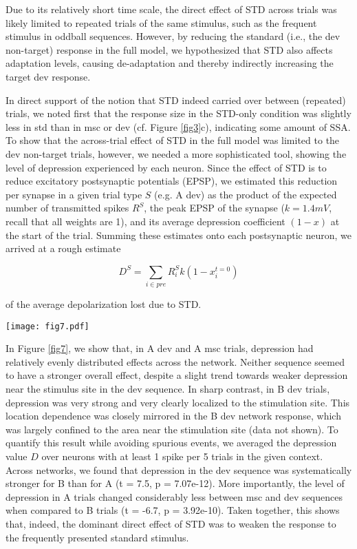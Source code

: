 \documentclass[pdflatex,referee,iicol,sn-basic]{sn-jnl}
\theoremstyle{thmstyleone}%
\theoremstyle{thmstyletwo}%
\theoremstyle{thmstylethree}%
\begin{document}
Due to its relatively short time scale, the direct effect of STD across trials was likely limited to repeated trials of the same stimulus, such as the frequent stimulus in oddball sequences. However, by reducing the standard (i.e., the dev non-target) response in the full model, we hypothesized that STD also affects adaptation levels, causing de-adaptation and thereby indirectly increasing the target dev response.

In direct support of the notion that STD indeed carried over between (repeated) trials, we noted first that the response size in the STD-only condition was slightly less in std than in msc or dev (cf. Figure \ref{fig3}c), indicating some amount of SSA. To show that the across-trial effect of STD in the full model was limited to the dev non-target trials, however, we needed a more sophisticated tool, showing the level of depression experienced by each neuron. Since the effect of STD is to reduce excitatory postsynaptic potentials (EPSP), we estimated this reduction per synapse in a given trial type $S$ (e.g. A dev) as the product of the expected number of transmitted spikes $R^S$, the peak EPSP of the synapse ($k = 1.4 mV$, recall that all weights are 1), and its average depression coefficient $(1-x)$ at the start of the trial. Summing these estimates onto each postsynaptic neuron, we arrived at a rough estimate

\begin{equation}
    D^S = \sum_{i \in pre} R^S_i k (1-x_i^{t=0})
\end{equation}

of the average depolarization lost due to STD.

\begin{figure*}%
    \centering
    \texttt{[image: fig7.pdf]}
    \caption{}
    \label{fig7}
\end{figure*}

In Figure \ref{fig7}, we show that, in A dev and A msc trials, depression had relatively evenly distributed effects across the network. Neither sequence seemed to have a stronger overall effect, despite a slight trend towards weaker depression near the stimulus site in the dev sequence. In sharp contrast, in B dev trials, depression was very strong and very clearly localized to the stimulation site. This location dependence was closely mirrored in the B dev network response, which was largely confined to the area near the stimulation site (data not shown). To quantify this result while avoiding spurious events, we averaged the depression value $D$ over neurons with at least 1 spike per 5 trials in the given context. Across networks, we found that depression in the dev sequence was systematically stronger for B than for A (t = 7.5, p = 7.07e-12). More importantly, the level of depression in A trials changed considerably less between msc and dev sequences when compared to B trials (t = -6.7, p = 3.92e-10). Taken together, this shows that, indeed, the dominant direct effect of STD was to weaken the response to the frequently presented standard stimulus.
\end{document}
